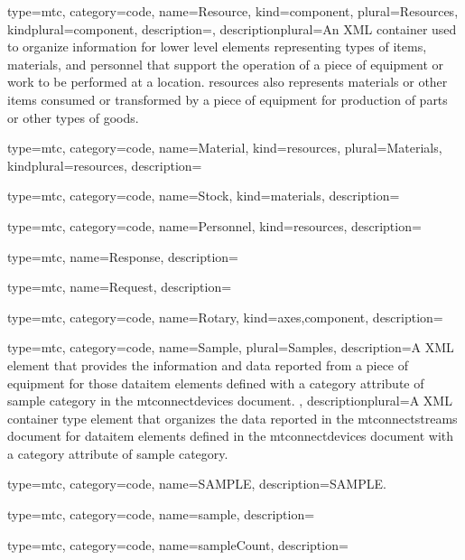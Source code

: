 {
  type=mtc,
  category=code,
  name={Resource},
  kind={component},
  plural={Resources},
  kindplural={component},
  description={},
  descriptionplural={An XML container used to organize information for \gls{lower level} elements representing types of items, materials, and personnel that support the operation of a piece of equipment or work to be performed at a location. \glspl{resource} also represents materials or other items consumed or transformed by a piece of equipment for production of parts or other types of goods.}
}


{
  type=mtc,
  category=code,
  name={Material},
  kind={resources},
  plural={Materials},
  kindplural={resources},
  description={}
}


{
  type=mtc,
  category=code,
  name={Stock},
  kind={materials},
  description={}
}


{
  type=mtc,
  category=code,
  name={Personnel},
  kind={resources},
  description={}
}


{
  type=mtc,
  name={Response},
  description={}
}


{
  type=mtc,
  name={Request},
  description={}
}


{
  type=mtc,
  category=code,
  name={Rotary},
  kind={axes,component},
  description={}
}


{
  type=mtc,
  category=code,
  name={Sample},
  plural={Samples},
  description={A XML element that provides the information and data reported from a piece of equipment for those \gls{dataitem} elements defined with a \gls{category} attribute of \gls{sample category} in the \glspl{mtconnectdevice} document. },
  descriptionplural={A XML container type element that organizes the data reported in the \glspl{mtconnectstream} document for \gls{dataitem} elements defined in the \glspl{mtconnectdevice} document with a \gls{category} attribute of \gls{sample category}.}
}


{
  type=mtc,
  category=code,
  name={SAMPLE},
  description={SAMPLE.}
}


{
  type=mtc,
  category=code,
  name={sample},
  description={}
}


{
  type=mtc,
  category=code,
  name={sampleCount},
  description={}
}


